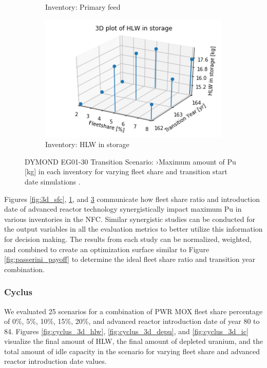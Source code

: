 \begin{figure}[]
\begin{subfigure}[t]{0.58\textwidth}
        \caption{Inventory: Primary feed}
	    \label{fig:3d_pf}
    \end{subfigure}
    \begin{subfigure}[t]{0.58\textwidth}
        \centering
        \includegraphics[width=\linewidth]{figures/3d_hlw} 
        \caption{Inventory: HLW in storage}
        \label{fig:3d_hlw}
    \end{subfigure}
    \caption{DYMOND EG01-30 Transition Scenario: ›Maximum amount of Pu [kg] in each inventory for varying fleet share and transition start date simulations \cite{chee_gwenchee/ddwrapper_2019}.}
\end{figure}

Figures \ref{fig:3d_sfc}, \ref{fig:3d_pf}, and \ref{fig:3d_hlw}
communicate how fleet share ratio and introduction date of advanced 
reactor technology 
synergistically impact maximum Pu in various inventories in the 
\gls{NFC}. 
Similar synergistic studies can be conducted for the output variables in 
all the evaluation metrics to better utilize this information for decision making. 
The results from each study can be normalized, weighted, and 
combined to create an optimization surface similar 
to Figure \ref{fig:passerini_payoff} to determine the ideal fleet share 
ratio and transition year combination. 

\subsubsection{\textbf{Cyclus}}
We evaluated 25 scenarios for a combination of PWR MOX fleet share percentage 
of 0\%, 5\%, 10\%, 15\%, 20\%, and advanced reactor introduction 
date of year 80 to 84.
Figures \ref{fig:cyclus_3d_hlw}, \ref{fig:cyclus_3d_depu}, and 
\ref{fig:cyclus_3d_ic}
visualize the final amount of HLW, the final amount of depleted uranium, 
and the total amount of idle capacity in the scenario for varying 
fleet share and advanced reactor introduction date values. 

